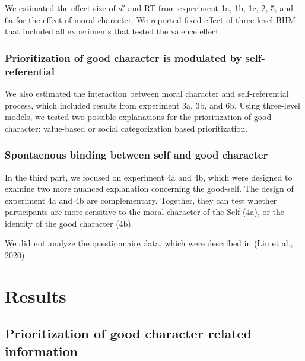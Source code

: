 \documentclass[
  man]{apa6}
\begin{document}
We estimated the effect size of \(d'\) and RT from experiment 1a, 1b, 1c, 2, 5, and 6a for the effect of moral character. We reported fixed effect of three-level BHM that included all experiments that tested the valence effect.

\hypertarget{prioritization-of-good-character-is-modulated-by-self-referential}{%
\subsubsection{Prioritization of good character is modulated by self-referential}\label{prioritization-of-good-character-is-modulated-by-self-referential}}

We also estimated the interaction between moral character and self-referential process, which included results from experiment 3a, 3b, and 6b. Using three-level models, we tested two possible explanations for the prioritization of good character: value-based or social categorization based prioritization.

\hypertarget{spontaenous-binding-between-self-and-good-character}{%
\subsubsection{Spontaenous binding between self and good character}\label{spontaenous-binding-between-self-and-good-character}}

In the third part, we focused on experiment 4a and 4b, which were designed to examine two more nuanced explanation concerning the good-self. The design of experiment 4a and 4b are complementary. Together, they can test whether participants are more sensitive to the moral character of the Self (4a), or the identity of the good character (4b).

We did not analyze the questionnaire data, which were described in (Liu et al., 2020).

\hypertarget{results}{%
\section{Results}\label{results}}

\hypertarget{prioritization-of-good-character-related-information}{%
\subsection{Prioritization of good character related information}\label{prioritization-of-good-character-related-information}}
\end{document}
